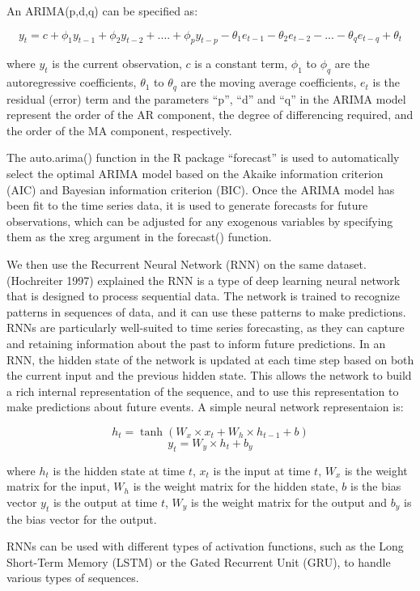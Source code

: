 \documentclass[
]{article}
\begin{document}
An ARIMA(p,d,q) can be specified as:

\[y_t = c + {\phi}_1y_{t-1} + {\phi}_2y_{t-2}+ .... +{\phi}_py_{t-p} - {\theta}_1e_{t-1} - {\theta}_2e_{t-2} - ... - {\theta}_qe_{t-q} + {\theta}_t\]

where \(y_t\) is the current observation, \(c\) is a constant term,
\({\phi}_1\) to \({\phi}_q\) are the autoregressive coefficients,
\({\theta}_1\) to \({\theta}_q\) are the moving average coefficients,
\(e_t\) is the residual (error) term and the parameters ``p'', ``d'' and
``q'' in the ARIMA model represent the order of the AR component, the
degree of differencing required, and the order of the MA component,
respectively.

The auto.arima() function in the R package ``forecast'' is used to
automatically select the optimal ARIMA model based on the Akaike
information criterion (AIC) and Bayesian information criterion (BIC).
Once the ARIMA model has been fit to the time series data, it is used to
generate forecasts for future observations, which can be adjusted for
any exogenous variables by specifying them as the xreg argument in the
forecast() function.

We then use the Recurrent Neural Network (RNN) on the same dataset.
(Hochreiter 1997) explained the RNN is a type of deep learning neural
network that is designed to process sequential data. The network is
trained to recognize patterns in sequences of data, and it can use these
patterns to make predictions. RNNs are particularly well-suited to time
series forecasting, as they can capture and retaining information about
the past to inform future predictions. In an RNN, the hidden state of
the network is updated at each time step based on both the current input
and the previous hidden state. This allows the network to build a rich
internal representation of the sequence, and to use this representation
to make predictions about future events. A simple neural network
representaion is:

\[h_t = \tanh(W_x \times x_t + W_h \times h_{t-1} + b)\]
\[y_t = W_y \times h_t + b_y\]

where \(h_t\) is the hidden state at time \(t\), \(x_t\) is the input at
time \(t\), \(W_x\) is the weight matrix for the input, \(W_h\) is the
weight matrix for the hidden state, \(b\) is the bias vector \(y_t\) is
the output at time \(t\), \(W_y\) is the weight matrix for the output
and \(b_y\) is the bias vector for the output.

RNNs can be used with different types of activation functions, such as
the Long Short-Term Memory (LSTM) or the Gated Recurrent Unit (GRU), to
handle various types of sequences.
\end{document}
